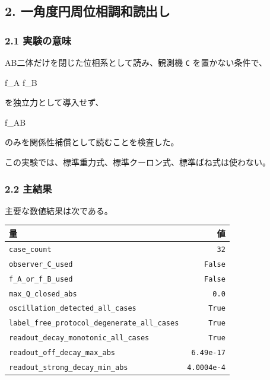 \documentclass[
]{article}
\newenvironment{Shaded}{}{}
\newcommand{\NormalTok}[1]{#1}
\newcounter{none} %
\begin{document}
\subsection{2.
一角度円周位相調和読出し}\label{ux4e00ux89d2ux5ea6ux5186ux5468ux4f4dux76f8ux8abfux548cux8aadux51faux3057}

\subsubsection{2.1 実験の意味}\label{ux5b9fux9a13ux306eux610fux5473}

AB二体だけを閉じた位相系として読み、観測機 \texttt{C} を置かない条件で、

\begin{Shaded}
\begin{Highlighting}[]
\NormalTok{f\_A}
\NormalTok{f\_B}
\end{Highlighting}
\end{Shaded}

を独立力として導入せず、

\begin{Shaded}
\begin{Highlighting}[]
\NormalTok{f\_AB}
\end{Highlighting}
\end{Shaded}

のみを関係性補償として読むことを検査した。

この実験では、標準重力式、標準クーロン式、標準ばね式は使わない。

\subsubsection{2.2 主結果}\label{ux4e3bux7d50ux679c}

主要な数値結果は次である。

{\def\LTcaptype{none} %
\begin{longtable}[]{@{}lr@{}}
\toprule\noalign{}
量 & 値 \\
\midrule\noalign{}
\endhead
\bottomrule\noalign{}
\endlastfoot
\texttt{case\_count} & \texttt{32} \\
\texttt{observer\_C\_used} & \texttt{False} \\
\texttt{f\_A\_or\_f\_B\_used} & \texttt{False} \\
\texttt{max\_Q\_closed\_abs} & \texttt{0.0} \\
\texttt{oscillation\_detected\_all\_cases} & \texttt{True} \\
\texttt{label\_free\_protocol\_degenerate\_all\_cases} &
\texttt{True} \\
\texttt{readout\_decay\_monotonic\_all\_cases} & \texttt{True} \\
\texttt{readout\_off\_decay\_max\_abs} & \texttt{6.49e-17} \\
\texttt{readout\_strong\_decay\_min\_abs} & \texttt{4.0004e-4} \\
\end{longtable}
}
\end{document}
